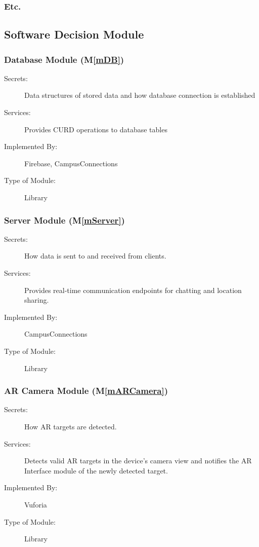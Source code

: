 \documentclass[12pt, titlepage]{article}
\newcommand{\mref}[1]{M\ref{#1}}
\begin{document}
\subsubsection{Etc.}


\subsection{Software Decision Module}

\subsubsection{Database Module (\mref{mDB})}
\begin{description}
\item[Secrets:]Data structures of stored data and how database connection is established
\item[Services:]Provides CURD operations to database tables
\item[Implemented By:] Firebase, CampusConnections
\item[Type of Module:] Library
\end{description}

\subsubsection{Server Module (\mref{mServer})}
\begin{description}
\item[Secrets:]How data is sent to and received from clients.
\item[Services:]Provides real-time communication endpoints for chatting and location sharing.
\item[Implemented By:] CampusConnections
\item[Type of Module:] Library
\end{description}

\subsubsection{AR Camera Module (\mref{mARCamera})}
\begin{description}
\item[Secrets:]How AR targets are detected.
\item[Services:]Detects valid AR targets in the device's camera view and notifies the AR Interface module of the newly detected target.
\item[Implemented By:] Vuforia
\item[Type of Module:] Library
\end{description}
\end{document}
